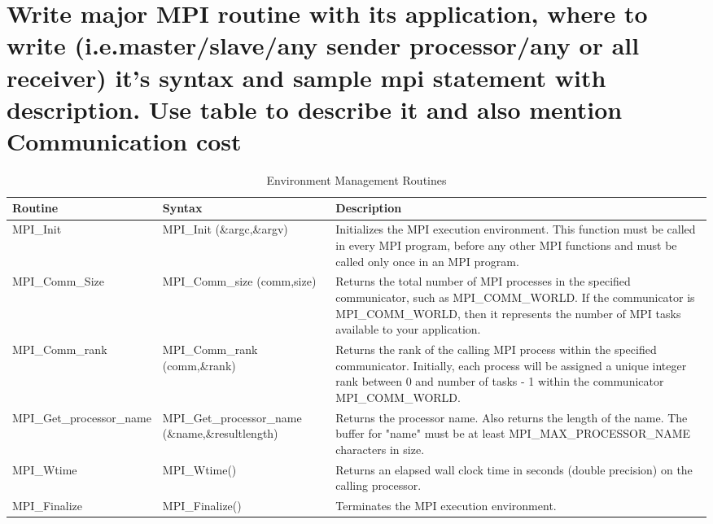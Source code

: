 \section{Write major MPI routine with its application, where to write (i.e.master/slave/any sender processor/any or all receiver) it's syntax and sample mpi statement with description. Use table to describe it and also mention Communication cost}

\begin{table}[!htbp]
    \hspace{-1cm}
    \begin{tabular}{l | p{4.5cm} | p{8cm}}
         \textbf{Routine} &  \textbf{Syntax} & \textbf{Description} \\ \hline
         \hline
             MPI\_Init 
             &  MPI\_Init (\&argc,\&argv) 
             & Initializes the MPI execution environment. This function must be called in every MPI program, before any other MPI functions and must be called only once in an MPI program.
         \\ \hline
            MPI\_Comm\_Size
            & MPI\_Comm\_size (comm,size)
            & Returns the total number of MPI processes in the specified communicator, such as MPI\_COMM\_WORLD. If the communicator is MPI\_COMM\_WORLD, then it represents the number of MPI tasks available to your application.
        \\ \hline
            MPI\_Comm\_rank
            & MPI\_Comm\_rank (comm,\&rank) 
            & Returns the rank of the calling MPI process within the specified communicator. Initially, each process will be assigned a unique integer rank between 0 and number of tasks - 1 within the communicator MPI\_COMM\_WORLD. 
        \\ \hline
            MPI\_Get\_processor\_name
            & MPI\_Get\_processor\_name (\&name,\&resultlength)
            & Returns the processor name. Also returns the length of the name. The buffer for "name" must be at least MPI\_MAX\_PROCESSOR\_NAME characters in size.
        \\ \hline
            MPI\_Wtime
            & MPI\_Wtime()
            & Returns an elapsed wall clock time in seconds (double precision) on the calling processor.
        \\ \hline
            MPI\_Finalize
            & MPI\_Finalize()
            & Terminates the MPI execution environment.
    \end{tabular}
    \caption{Environment Management Routines}
    \label{tab:EnvironmentManagementRoutines}
\end{table}

